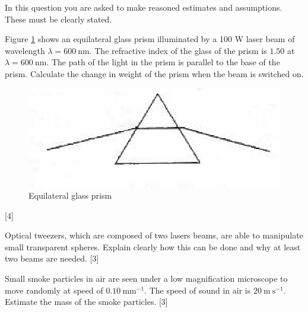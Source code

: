 \begin{problem}
    In this question you are asked to make reasoned estimates and assumptions. These must be clearly stated.
    \begin{subproblem}
        Figure \ref{2011q2} shows an equilateral glass prism illuminated by a 100 W laser beam of wavelength $\lambda=\qty{600}{\nm}$. The refractive index of the glass of the prism is $1.50$ at $\lambda=600 \mathrm{~nm}$. The path of the light in the prism is parallel to the base of the prism. Calculate the change in weight of the prism when the beam is switched on.
        \begin{figure}[h]
	        \centering
	        \includegraphics[width=0.8\linewidth]{spho_book_TYS_images/2011q2.png}
	        \caption{Equilateral glass prism} \label{2011q2}
        \end{figure}
    \hfill{[4]}\end{subproblem}
    
    \begin{subproblem}
        Optical tweezers, which are composed of two lasers beams, are able to manipulate small transparent spheres. Explain clearly how this can be done and why at least two beams are needed.
    \hfill{[3]}\end{subproblem}
    
    \begin{subproblem}
        Small smoke particles in air are seen under a low magnification microscope to move randomly at speed of $0.10 \mathrm{~mm}^{-1}$. The speed of sound in air is $20 \mathrm{~m} \mathrm{~s}^{-1}$. Estimate the mass of the smoke particles.
    \hfill{[3]}\end{subproblem}
\end{problem}

